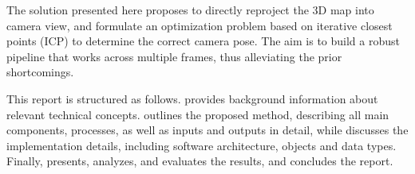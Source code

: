 The solution presented here proposes to directly reproject the 3D map into camera view, and formulate an optimization problem based on iterative closest points (ICP) to determine the correct camera pose. The aim is to build a robust pipeline that works across multiple frames, thus alleviating the prior shortcomings.

This report is structured as follows.  provides background information about relevant technical concepts.  outlines the proposed method, describing all main components, processes, as well as inputs and outputs in detail, while  discusses the implementation details, including software architecture, objects and data types. Finally,  presents, analyzes, and evaluates the results, and  concludes the report.